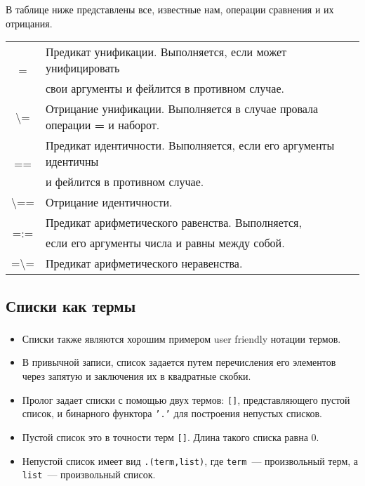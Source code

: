 \begin{frame}

	\frametitle{\insertsection}
	\framesubtitle{\insertsubsection}
	
	В таблице ниже представлены все, известные нам, операции сравнения и их отрицания.
	
	\begin{table}
		\centering
		\begin{tabular}{ c l }
			\multirow{2}{*}{=} & Предикат унификации. Выполняется, если может унифицировать \\ 
			& свои аргументы и фейлится в противном случае. \\
			\textbackslash= & Отрицание унификации. Выполняется в случае провала операции \textbf{=} и наборот. \\
			\multirow{2}{*}{==} & Предикат идентичности. Выполняется, если его аргументы идентичны \\ & и фейлится в противном случае. \\
			\textbackslash== & Отрицание идентичности. \\
			\multirow{2}{*}{=:=} & Предикат арифметического равенства. Выполняется, \\ & если его аргументы числа и равны между собой. \\
			=\textbackslash= & Предикат арифметического неравенства. \\
		\end{tabular}
	\end{table}

\end{frame}


\subsection{Списки как термы}


\begin{frame}

	\frametitle{\insertsection}
	\framesubtitle{\insertsubsection}
	
	\begin{itemize}
		\item Списки также являются хорошим примером user friendly нотации термов.
		\item В привычной записи, список задается путем перечисления его элементов через запятую и заключения их в квадратные скобки.
		\item Пролог задает списки с помощью двух термов: \texttt{[]}, представляющего пустой список, и бинарного функтора \texttt{'.'} для построения непустых списков.
		\item Пустой список это в точности терм \texttt{[]}. Длина такого списка равна 0.
		\item Непустой список имеет вид \texttt{.(term,list)}, где \texttt{term}~--- произвольный терм, а \texttt{list}~--- произвольный список.
	\end{itemize}

\end{frame}


